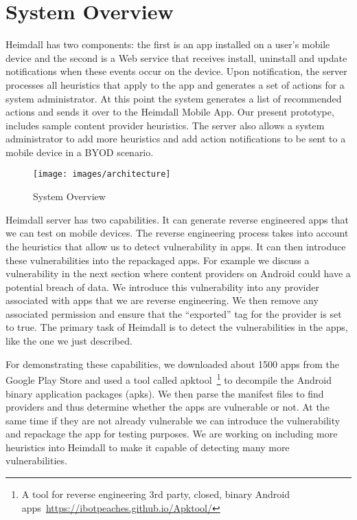 \section{System Overview}
\label{overview}
\noindent
Heimdall has two components: the first is an app installed on a user's mobile device and the second is a Web service that receives install, uninstall and update notifications when these events occur on the device. Upon notification, the server processes all heuristics that apply to the app and generates a set of actions for a system administrator. At this point the system generates a list of recommended actions and sends it over to the Heimdall Mobile App. Our present prototype, includes sample content provider heuristics. The server also allows a system administrator to add more heuristics and add action notifications to be sent to a mobile device in a BYOD scenario.

\begin{figure}[tb]
	\centering
	\texttt{[image: images/architecture]}
	\caption{System Overview}
	\label{fig:arch}
\end{figure}

\noindent
Heimdall server has two capabilities. It can generate reverse engineered apps that we can test on mobile devices. The reverse engineering process takes into account the heuristics that allow us to detect vulnerability in apps. It can then introduce these vulnerabilities into the repackaged apps. For example we discuss a vulnerability in the next section where content providers on Android could have a potential breach of data. We introduce this vulnerability into any provider associated with apps that we are reverse engineering. We then remove any associated permission and ensure that the ``exported'' tag for the provider is set to true. The primary task of Heimdall is to detect the vulnerabilities in the apps, like the one we just described.

For demonstrating these capabilities, we downloaded about 1500 apps from the Google Play Store and used a tool called apktool~\footnote{A tool for reverse engineering 3rd party, closed, binary Android apps~\url{https://ibotpeaches.github.io/Apktool/}} to decompile the Android binary application packages (apks). We then parse the manifest files to find providers and thus determine whether the apps are vulnerable or not. At the same time if they are not already vulnerable we can introduce the vulnerability and repackage the app for testing purposes. We are working on including more heuristics into Heimdall to make it capable of detecting many more vulnerabilities.